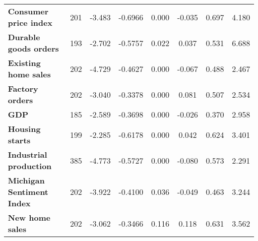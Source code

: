 \begin{landscape}
\begin{table}[]
\begin{center}
\begin{tabular}{@{}lccccccc@{}}
\textbf{Consumer price index}     & 201                               & -3.483                            & -0.6966                              & 0.000                    & -0.035                   & 0.697                       & 4.180                    \\
\textbf{Durable goods orders}     & 193                               & -2.702                            & -0.5757                              & 0.022                    & 0.037                    & 0.531                       & 6.688                    \\
\textbf{Existing home sales}      & 202                               & -4.729                            & -0.4627                              & 0.000                    & -0.067                   & 0.488                       & 2.467                    \\
\textbf{Factory orders}           & 202                               & -3.040                            & -0.3378                              & 0.000                    & 0.081                    & 0.507                       & 2.534                    \\
\textbf{GDP}                      & 185                               & -2.589                            & -0.3698                              & 0.000                    & -0.026                   & 0.370                       & 2.958                    \\
\textbf{Housing starts}           & 199                               & -2.285                            & -0.6178                              & 0.000                    & 0.042                    & 0.624                       & 3.401                    \\
\textbf{Industrial production}    & 385                               & -4.773                            & -0.5727                              & 0.000                    & -0.080                   & 0.573                       & 2.291                    \\
\textbf{Michigan Sentiment Index} & 202                               & -3.922                            & -0.4100                              & 0.036                    & -0.049                   & 0.463                       & 3.244                    \\
\textbf{New home sales}           & 202                               & -3.062                            & -0.3466                              & 0.116                    & 0.118                    & 0.631                       & 3.562                    \\

\end{tabular}
\end{center}
\end{table}
\end{landscape}
